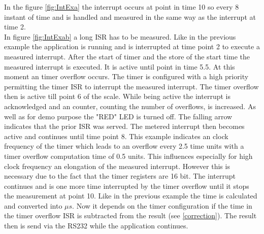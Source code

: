 In the figure \ref{fig:IntExa} the interrupt occurs at point in time 10 so every 8 instant of time and is handled and measured in the same way as the interrupt at time 2.\\
In figure \ref{fig:IntExab} a long \ac{ISR} has to be measured. Like in the previous example the application is running and is interrupted at time point 2 to execute a measured interrupt. After the start of timer and the store of the start time the measured interrupt is executed. It is active until point in time 5.5. At this moment an timer overflow occurs. The timer is configured with a high priority permitting the timer \ac{ISR} to interrupt the measured interrupt. The timer overflow then is active till point 6 of the scale. While being active the interrupt is acknowledged and an counter, counting the number of overflows, is increased. As well as for demo purpose the "RED" LED is turned off. The falling arrow indicates that the prior \ac{ISR} was served. The metered interrupt then becomes active and continues until time point 8. This example indicates an clock frequency of the timer which leads to an overflow every 2.5 time units with a timer overflow computation time of 0.5 units. This influences especially for high clock frequency an elongation of the measured interrupt. However this is necessary due to the fact that the timer registers are 16 bit. The interrupt continues and is one more time interrupted by the timer overflow until it stops the measurement at point 10. Like in the previous example the time is calculated and converted into $\mu s$. Now it depends on the timer configuration if the time in the timer overflow \ac{ISR} is subtracted from the result (see \autoref{correction}). The result then is send via the RS232 while the application continues.\\
